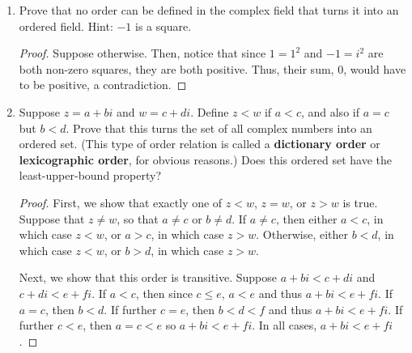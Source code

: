 \documentclass{scrbook}
\newcommand{\N}{\mathbb{N}}
\newcommand{\R}{\mathbb{R}}
\begin{document}
\begin{enumerate}
\begin{enumerate}[(a)]
\begin{proof}
Similarly, if $b^x > y$, then from (e), there exists some $n \in \N$ such that $b^{x - 1/n} > y$, and so for any $w \in A$, we have $b^w < y < b^{x - 1/n}$ and thus $w < x - 1/n$ from the lemma in Exercise 6(c), making $x - 1/n$ a smaller upper bound for $A$, a contradiction.
\end{proof}

\item Prove that this $x$ is unique.
\begin{proof}
Suppose that $x \ne y$ in $\R$ and $b^x = b^y$. Without loss of generality, suppose $x < y$. But then $b^x < b^y$ from the statement proved in Exercise 6(c), contradicting our assumption, so we are done.
\end{proof}
\end{enumerate}

\item Prove that no order can be defined in the complex field that turns it into an ordered field. Hint: $-1$ is a square.

\begin{proof}
Suppose otherwise. Then, notice that since $1 = 1^2$ and $-1 = i^2$ are both non-zero squares, they are both positive. Thus, their sum, 0, would have to be positive, a contradiction.
\end{proof}

\item Suppose $z = a + bi$ and $w = c + di$. Define $z < w$ if $a < c$,  and also if $a = c$ but $b < d$. Prove that this turns the set of all complex numbers into an ordered set. (This type of order relation is called a \textbf{dictionary order} or \textbf{lexicographic order}, for obvious reasons.) Does this ordered set have the least-upper-bound property?

\begin{proof}
First, we show that exactly one of $z < w$, $z = w$, or $z > w$ is true. Suppose that $z \ne w$, so that $a \ne c$ or $b \ne d$. If $a \ne c$, then either $a < c$, in which case $z < w$, or $a > c$, in which case $z > w$. Otherwise, either $b < d$, in which case $z < w$, or $b > d$, in which case $z > w$. 

Next, we show that this order is transitive. Suppose $a + bi < c + di$ and $c + di < e + fi$. If $a < c$, then since $c \le e$, $a < e$ and thus $a + bi < e + fi$. If $a = c$, then $b < d$. If further $c = e$, then $b < d < f$ and thus $a + bi < e + fi$. If further $c < e$, then $a = c < e$ so $a + bi < e + fi$. In all cases, $a + bi < e + fi$.


\end{proof}
\end{enumerate}
\end{document}
